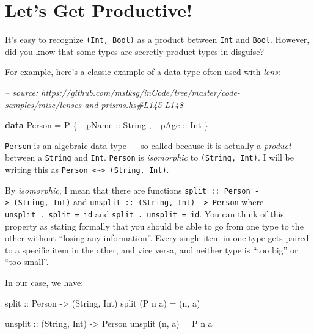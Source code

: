 \documentclass[]{article}
\newenvironment{Shaded}{}{}
\newcommand{\CommentTok}[1]{\textcolor[rgb]{0.38,0.63,0.69}{\textit{#1}}}
\newcommand{\DataTypeTok}[1]{\textcolor[rgb]{0.56,0.13,0.00}{#1}}
\newcommand{\FunctionTok}[1]{\textcolor[rgb]{0.02,0.16,0.49}{#1}}
\newcommand{\KeywordTok}[1]{\textcolor[rgb]{0.00,0.44,0.13}{\textbf{#1}}}
\newcommand{\NormalTok}[1]{#1}
\newcommand{\OtherTok}[1]{\textcolor[rgb]{0.00,0.44,0.13}{#1}}
\begin{document}
\hypertarget{lets-get-productive}{%
\section{Let's Get Productive!}\label{lets-get-productive}}

It's easy to recognize \texttt{(Int,\ Bool)} as a product between \texttt{Int}
and \texttt{Bool}. However, did you know that some types are secretly product
types in disguise?

For example, here's a classic example of a data type often used with
\emph{lens}:

\begin{Shaded}
\begin{Highlighting}[]
\CommentTok{-- source: https://github.com/mstksg/inCode/tree/master/code-samples/misc/lenses-and-prisms.hs#L145-L148}

\KeywordTok{data} \DataTypeTok{Person} \FunctionTok{=} \DataTypeTok{P}
\NormalTok{    \{}\OtherTok{ _pName ::} \DataTypeTok{String}
\NormalTok{    ,}\OtherTok{ _pAge  ::} \DataTypeTok{Int}
\NormalTok{    \}}
\end{Highlighting}
\end{Shaded}

\texttt{Person} is an algebraic data type --- so-called because it is actually a
\emph{product} between a \texttt{String} and \texttt{Int}. \texttt{Person} is
\emph{isomorphic} to \texttt{(String,\ Int)}. I will be writing this as
\texttt{Person\ \textless{}\textasciitilde{}\textgreater{}\ (String,\ Int)}.

By \emph{isomorphic}, I mean that there are functions
\texttt{split\ ::\ Person\ -\textgreater{}\ (String,\ Int)} and
\texttt{unsplit\ ::\ (String,\ Int)\ -\textgreater{}\ Person} where
\texttt{unsplit\ .\ split\ =\ id} and \texttt{split\ .\ unsplit\ =\ id}. You can
think of this property as stating formally that you should be able to go from
one type to the other without ``losing any information''. Every single item in
one type gets paired to a specific item in the other, and vice versa, and
neither type is ``too big'' or ``too small''.

In our case, we have:

\begin{Shaded}
\begin{Highlighting}[]
\OtherTok{split ::} \DataTypeTok{Person} \OtherTok{->}\NormalTok{ (}\DataTypeTok{String}\NormalTok{, }\DataTypeTok{Int}\NormalTok{)}
\NormalTok{split (}\DataTypeTok{P}\NormalTok{ n a) }\FunctionTok{=}\NormalTok{ (n, a)}

\OtherTok{unsplit ::}\NormalTok{ (}\DataTypeTok{String}\NormalTok{, }\DataTypeTok{Int}\NormalTok{) }\OtherTok{->} \DataTypeTok{Person}
\NormalTok{unsplit (n, a) }\FunctionTok{=} \DataTypeTok{P}\NormalTok{ n a}
\end{Highlighting}
\end{Shaded}
\end{document}
